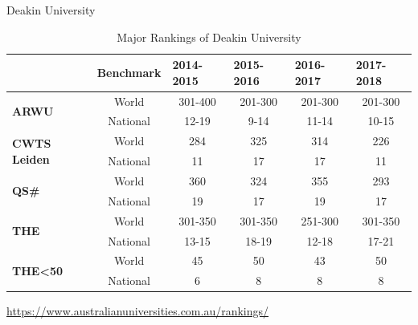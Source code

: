 \begin{slide}[toc=,bm=]{Deakin University}
	\begin{table}[htbp]
		\setlength{\abovecaptionskip}{-21pt}
		\setlength{\belowcaptionskip}{12pt}
		\centering
		\caption{Major Rankings of Deakin University}
		\begin{tabular}{l|c|cccc}
			\toprule
			& \textbf{Benchmark} & \multicolumn{1}{l}{\textbf{2014-2015}} & \multicolumn{1}{l}{\textbf{2015-2016}} & \multicolumn{1}{l}{\textbf{2016-2017}} & \multicolumn{1}{l}{\textbf{2017-2018}} \\ \midrule
			\multirow{2}[0]{*}{\textbf{ARWU}} & World & 301-400 & 201-300 & 201-300 & 201-300 \\
			& National  & 12-19 & 9-14  & 11-14  & 10-15 \\
			\midrule
			\multirow{2}[0]{*}{\textbf{CWTS Leiden}} & World  & 284 & 325 & 314 & 226 \\
			& National  & 11 & 17 & 17 & 11 \\
			\midrule
			\multirow{2}[0]{*}{\textbf{QS\#}} & World  & 360 & 324 & 355 & 293 \\
			& National & 19 & 17 & 19  & 17 \\
			\midrule
			\multirow{2}[0]{*}{\textbf{THE} } & World  & 301-350 & 301-350 & 251-300 & 301-350 \\
			& National  & 13-15 & 18-19  & 12-18  & 17-21 \\
			\midrule
			\multirow{2}[0]{*}{\textbf{THE<50}} & World  & 45 & 50 & 43  & 50 \\
			& National  & 6 & 8  & 8  & 8 \\
			\bottomrule
		\end{tabular}
		\label{tab:Deakin Ranking}
	\end{table}
	\centering
	\url{https://www.australianuniversities.com.au/rankings/}
\end{slide}


